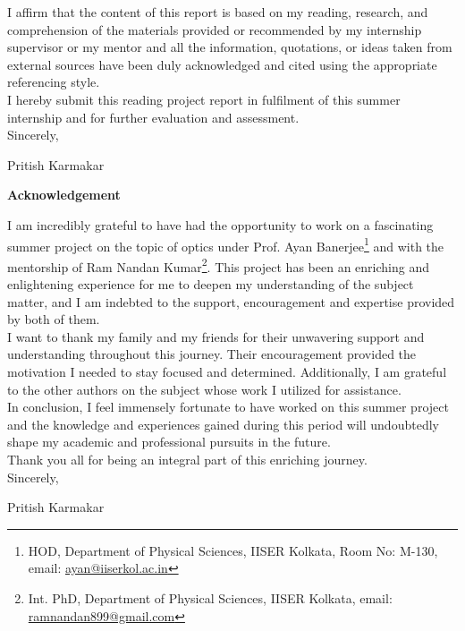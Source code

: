 \documentclass[11pt,a4paper]{article}
\numberwithin{equation}{section}
\begin{document}
\begin{titlepage}
		I affirm that the content of this report is based on my reading, research, and comprehension of the materials provided or recommended by my internship supervisor or my mentor and all the information, quotations, or ideas taken from external sources have been duly acknowledged and cited using the appropriate referencing style.\\
		
		I hereby submit this reading project report in fulfilment of
		this summer internship and for further evaluation and assessment.\\
		
		Sincerely,
		
		{\LARGE Pritish Karmakar}\\
		
		
		\clearpage 
		
		{\Huge\bfseries Acknowledgement}\\
		\vspace{9mm}
		
		\Large
		I am incredibly grateful to have had the opportunity to work on a fascinating summer project on the topic of optics under  {Prof. Ayan Banerjee}\footnote{HOD, Department of Physical Sciences, IISER Kolkata, Room No: M-130, email: \href{mailto:ayan@iiserkol.ac.in}{ayan@iiserkol.ac.in}} and with the mentorship of {Ram Nandan Kumar}\footnote{Int. PhD, Department of Physical Sciences, IISER Kolkata, email: \href{mailto:ramnandan899@gmail.com}{ramnandan899@gmail.com}}. This project has been an enriching and enlightening experience for me to deepen my understanding of the subject matter, and I am indebted to the support, encouragement and expertise provided by both of them.\\
		
		I want to thank my family and my friends for their unwavering support and understanding throughout this journey. Their encouragement provided the motivation I needed to stay focused and determined. Additionally, I am grateful to the other authors on the subject whose work I utilized for assistance.\\
		
		In conclusion, I feel immensely fortunate to have worked on this summer project and the knowledge and experiences gained during this period will undoubtedly shape my academic and professional pursuits in the future.\\
		
		Thank you all for being an integral part of this enriching journey.\\

		
		Sincerely,
		
		{\LARGE Pritish Karmakar}
		\newpage
		
		
		\normalsize
		\tableofcontents
		\clearpage
		\listoffigures
		\listoftables
		
	\end{titlepage}
\end{document}
